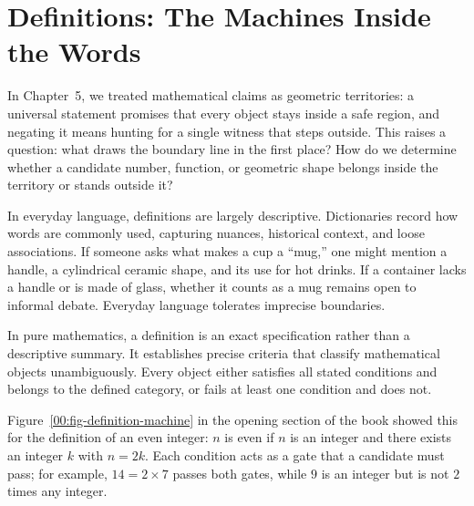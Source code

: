 \section{Definitions: The Machines Inside the Words}
\chapterline

In Chapter~5, we treated mathematical claims as geometric territories: a universal statement promises that every object stays inside a safe region, and negating it means hunting for a single witness that steps outside. This raises a question: what draws the boundary line in the first place? How do we determine whether a candidate number, function, or geometric shape belongs inside the territory or stands outside it?

In everyday language, definitions are largely descriptive. Dictionaries record how words are commonly used, capturing nuances, historical context, and loose associations. If someone asks what makes a cup a ``mug,'' one might mention a handle, a cylindrical ceramic shape, and its use for hot drinks. If a container lacks a handle or is made of glass, whether it counts as a mug remains open to informal debate. Everyday language tolerates imprecise boundaries.

In pure mathematics, a definition is an exact specification rather than a descriptive summary. It establishes precise criteria that classify mathematical objects unambiguously. Every object either satisfies all stated conditions and belongs to the defined category, or fails at least one condition and does not.

Figure~\ref{00:fig-definition-machine} in the opening section of the book showed this for the definition of an even integer: $n$ is even if $n$ is an integer and there exists an integer $k$ with $n = 2k$. Each condition acts as a gate that a candidate must pass; for example, $14 = 2 \times 7$ passes both gates, while $9$ is an integer but is not $2$ times any integer.

